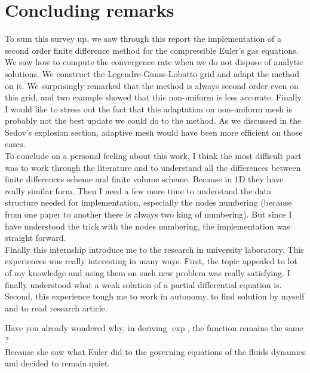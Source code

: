\section{Concluding remarks}
To sum this survey up, we saw through this report the implementation of a second order finite difference method for the compressible Euler's gas equations. We saw how to compute the convergence rate when we do not dispose of analytic solutions. We construct the Legendre-Gauss-Lobatto grid and adapt the method on it. We surprisingly remarked that the method is always second order even on this grid, and two example showed that this non-uniform is less accurate. Finally I would like to stress out the fact that this adaptation on non-uniform mesh is probably not the best update we could do to the method. As we discussed in the Sedov's explosion section, adaptive mesh would have been more efficient on those cases. \\

To conclude on a personal feeling about this work, I think the most difficult part was to work through the literature and to understand all the differences between finite differences scheme and finite volume scheme. Because in 1D they have really similar form. Then I need a few more time to understand the data structure needed for implementation, especially the nodes numbering (because from one paper to another there is always two king of numbering). But since I have understood the trick with the nodes numbering, the implementation was straight forward. \\

Finally this internship introduce me to the research in university laboratory. This experiences was really interesting in many ways. First, the topic appealed to lot of my knowledge and using them on such new problem was really satisfying. I finally understood what a weak solution of a partial differential equation is. Second, this experience tough me to work in autonomy, to find solution by myself and to read research article. \\
\newline

\begin{center}
\begin{minipage}{0.6\linewidth}
\begin{joke}
Have you already wondered why, in deriving $\exp$, the function remains the same ? \\
Because she saw what Euler did to the governing equations of the fluids dynamics and decided to remain quiet. 
\end{joke}
\end{minipage}
\end{center}